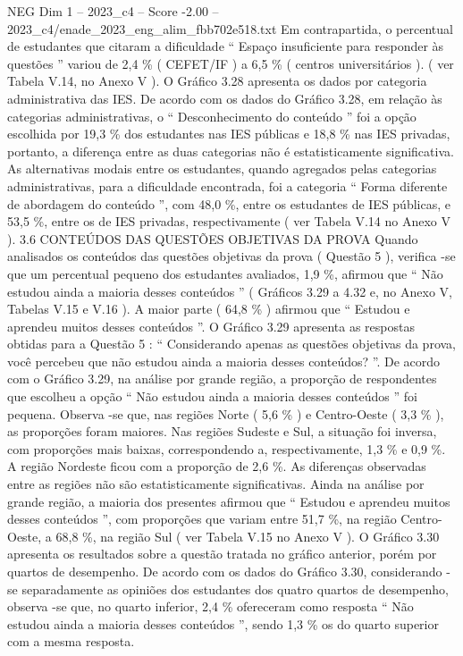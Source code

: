 \begin{textsample}{NEG Dim 1 – 2023\_c4 – Score -2.00 – 2023\_c4/enade\_2023\_eng\_alim\_fbb702e518.txt}
Em contrapartida, o percentual de estudantes que citaram a dificuldade “ Espaço insuficiente para responder às questões ” variou de 2,4 \% ( CEFET/IF ) a 6,5 \% ( centros universitários ). ( ver Tabela V.14, no Anexo V ).
O Gráfico 3.28 apresenta os dados por categoria administrativa das IES.
De acordo com os dados do Gráfico 3.28, em relação às categorias administrativas, o “ Desconhecimento do conteúdo ” foi a opção escolhida por 19,3 \% dos estudantes nas IES públicas e 18,8 \% nas IES privadas, portanto, a diferença entre as duas categorias não é estatisticamente significativa.
As alternativas modais entre os estudantes, quando agregados pelas categorias administrativas, para a dificuldade encontrada, foi a categoria “ Forma diferente de abordagem do conteúdo ”, com 48,0 \%, entre os estudantes de IES públicas, e 53,5 \%, entre os de IES privadas, respectivamente ( ver Tabela V.14 no Anexo V ). 3.6 CONTEÚDOS DAS QUESTÕES OBJETIVAS DA PROVA Quando analisados os conteúdos das questões objetivas da prova ( Questão 5 ), verifica -se que um percentual pequeno dos estudantes avaliados, 1,9 \%, afirmou que “ Não estudou ainda a maioria desses conteúdos ” ( Gráficos 3.29 a 4.32 e, no Anexo V, Tabelas V.15 e V.16 ).
A maior parte ( 64,8 \% ) afirmou que “ Estudou e aprendeu muitos desses conteúdos ”.
O Gráfico 3.29 apresenta as respostas obtidas para a Questão 5 : “ Considerando apenas as questões objetivas da prova, você percebeu que não estudou ainda a maioria desses conteúdos? ”.
De acordo com o Gráfico 3.29, na análise por grande região, a proporção de respondentes que escolheu a opção “ Não estudou ainda a maioria desses conteúdos ” foi pequena.
Observa -se que, nas regiões Norte ( 5,6 \% ) e Centro-Oeste ( 3,3 \% ), as proporções foram maiores.
Nas regiões Sudeste e Sul, a situação foi inversa, com proporções mais baixas, correspondendo a, respectivamente, 1,3 \% e 0,9 \%.
A região Nordeste ficou com a proporção de 2,6 \%.
As diferenças observadas entre as regiões não são estatisticamente significativas.
Ainda na análise por grande região, a maioria dos presentes afirmou que “ Estudou e aprendeu muitos desses conteúdos ”, com proporções que variam entre 51,7 \%, na região Centro-Oeste, a 68,8 \%, na região Sul ( ver Tabela V.15 no Anexo V ).
O Gráfico 3.30 apresenta os resultados sobre a questão tratada no gráfico anterior, porém por quartos de desempenho.
De acordo com os dados do Gráfico 3.30, considerando -se separadamente as opiniões dos estudantes dos quatro quartos de desempenho, observa -se que, no quarto inferior, 2,4 \% ofereceram como resposta “ Não estudou ainda a maioria desses conteúdos ”, sendo 1,3 \% os do quarto superior com a mesma resposta.

\end{textsample}
